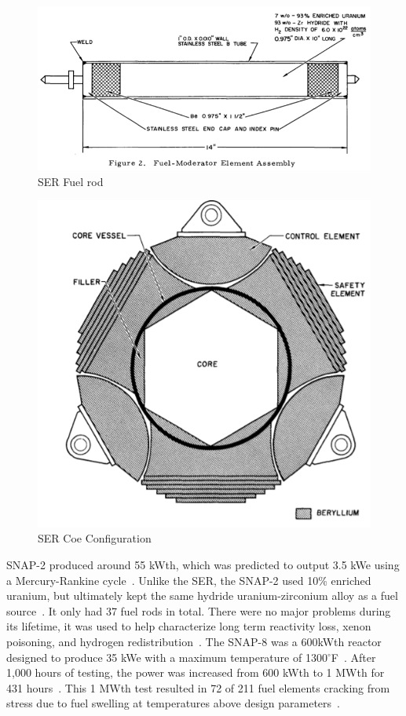 \documentclass{article}
\begin{document}
\begin{figure}[]
	\centering
	\includegraphics[height=0.35\textheight]{fig/appA}
	\caption[SER Fuel rod]{SER Fuel rod~\cite{lords1994snap}}
	\label{appA}
\end{figure}

\begin{figure}[]
	\centering
	\includegraphics[height=0.45\textheight]{fig/appB}
	\caption[SER Coe Configuration]{SER Coe Configuration~\cite{lords1994snap}}
	\label{appB}
\end{figure}


SNAP-2 produced around 55 kWth, which was predicted to output 3.5 kWe using a Mercury-Rankine cycle~\cite{voss1984snap}. Unlike the SER, the SNAP-2 used 10\% enriched uranium, but ultimately kept the same hydride uranium-zirconium alloy as a fuel source~\cite{ohlenkamp1966snap}. It only had 37 fuel rods in total. There were no major problems during its lifetime, it was used to help characterize long term reactivity loss, xenon poisoning, and hydrogen redistribution~\cite{voss1984snap}. The SNAP-8 was a 600kWth reactor designed to produce 35 kWe with a maximum temperature of 1300$^{\circ}$F~\cite{daye1967snap}. After 1,000 hours of testing, the power was increased from 600 kWth to 1 MWth for 431 hours~\cite{voss1984snap}. This 1 MWth test resulted in 72 of 211 fuel elements cracking from stress due to fuel swelling at temperatures above design parameters~\cite{voss1984snap}. 
\end{document}
